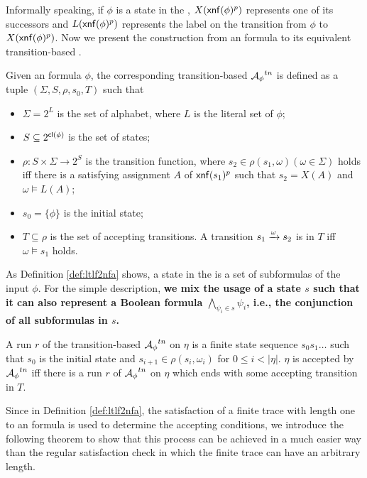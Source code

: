 Informally speaking, if $\phi$ is a state in the \NFA, $X({\sf xnf}(\phi)^p)$ represents one of its successors and $L({\sf xnf}(\phi)^p)$ represents the label on the transition from $\phi$ to $X({\sf xnf}(\phi)^p)$. Now we present the construction from an \ltlf formula to its equivalent transition-based \NFA. 

   
\begin{definition}\label{def:ltlf2nfa} 
Given an \ltlf formula $\phi$, the corresponding transition-based \NFA ${\mathcal{A}_{\phi}}^{tn}$ is defined as a tuple $(\Sigma, S, \rho, s_0, T)$ such that
\begin{itemize}
	\item $\Sigma = 2^{L}$ is the set of alphabet, where $L$ is the literal set of $\phi$;
	\item $S\subseteq 2^{{\sf cl}(\phi)}$ is the set of states;
	\item $\rho:  S \times \Sigma \to 2^S$ is the transition function, where $s_2 \in \rho(s_1, \omega) (\omega \in \Sigma)$ holds iff there is a satisfying assignment $A$ of ${\sf xnf}(s_1)^p$ such that $s_2 = X(A)$ and $\omega\models L(A)$;
	\item $s_0 = \{\phi \}$ is the initial state;
	\item $T\subseteq \rho$ is the set of accepting transitions. A transition $s_1\xrightarrow[]{\omega}s_2$ is in $T$ iff $\omega\models s_1$ holds. 
\end{itemize}
\end{definition}

As Definition \ref{def:ltlf2nfa} shows, a state in the \NFA is a set of subformulas of the input $\phi$. For the simple description, \textbf{we mix the usage of a state $s$ such that it can also represent a Boolean formula $\bigwedge_{\psi_i\in s}\psi_i$, i.e., the conjunction of all subformulas in $s$.} 

A run $r$ of the transition-based \NFA ${\mathcal{A}_{\phi}}^{tn}$ on $\eta$ is a finite state sequence $s_0 s_1\ldots$ such that $s_0$ is the initial state and $s_{i+1}\in\rho(s_i,\omega_i)$ for $0\leq i < |\eta|$. $\eta$ is accepted by ${\mathcal{A}_{\phi}}^{tn}$ iff there is a run $r$ of ${\mathcal{A}_{\phi}}^{tn}$ on $\eta$ which ends with some accepting transition in $T$. 

Since in Definition \ref{def:ltlf2nfa}, the satisfaction of a finite trace with length one to an \ltlf formula is used to determine the accepting conditions, we introduce the following theorem to show that this process can be achieved in a much easier way than the regular satisfaction check in which the finite trace can have an arbitrary length.

